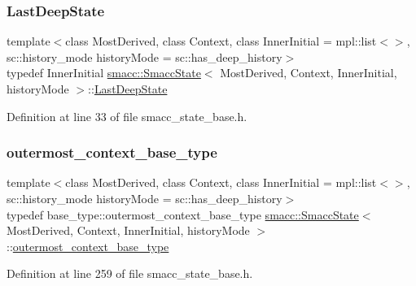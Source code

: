 \subsubsection{\texorpdfstring{Last\+Deep\+State}{LastDeepState}}
{\footnotesize\ttfamily template$<$class Most\+Derived, class Context, class Inner\+Initial = mpl\+::list$<$$>$, sc\+::history\+\_\+mode history\+Mode = sc\+::has\+\_\+deep\+\_\+history$>$ \\
typedef Inner\+Initial \hyperlink{classsmacc_1_1SmaccState}{smacc\+::\+Smacc\+State}$<$ Most\+Derived, Context, Inner\+Initial, history\+Mode $>$\+::\hyperlink{classsmacc_1_1SmaccState_a60088405d2d99d468caa0baa3b2830a8}{Last\+Deep\+State}}



Definition at line 33 of file smacc\+\_\+state\+\_\+base.\+h.

\mbox{\label{classsmacc_1_1SmaccState_aaf76bbe2aa9dd73e3284605f84ab4b16}} 
\subsubsection{\texorpdfstring{outermost\+\_\+context\+\_\+base\+\_\+type}{outermost\_context\_base\_type}}
{\footnotesize\ttfamily template$<$class Most\+Derived, class Context, class Inner\+Initial = mpl\+::list$<$$>$, sc\+::history\+\_\+mode history\+Mode = sc\+::has\+\_\+deep\+\_\+history$>$ \\
typedef base\+\_\+type\+::outermost\+\_\+context\+\_\+base\+\_\+type \hyperlink{classsmacc_1_1SmaccState}{smacc\+::\+Smacc\+State}$<$ Most\+Derived, Context, Inner\+Initial, history\+Mode $>$\+::\hyperlink{classsmacc_1_1SmaccState_aaf76bbe2aa9dd73e3284605f84ab4b16}{outermost\+\_\+context\+\_\+base\+\_\+type}}



Definition at line 259 of file smacc\+\_\+state\+\_\+base.\+h.

\mbox{\label{classsmacc_1_1SmaccState_a12497b38e710f07cacb5d45efc024339}} 
